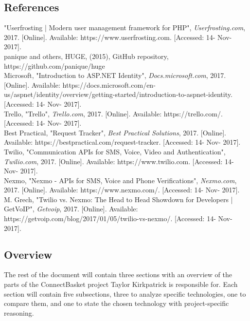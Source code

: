 \documentclass[onecolumn, draftclsnofoot,10pt, compsoc]{IEEEtran}
\begin{document}
\subsection{References}
\begin{thebibliography}{8}
"Userfrosting | Modern user management framework for PHP", \textit{Userfrosting.com}, 2017. [Online]. Available: https://www.userfrosting.com. [Accessed: 14- Nov- 2017].\\
 panique and others, HUGE, (2015), GitHub repository, https://github.com/panique/huge \\ 
 Microsoft, "Introduction to ASP.NET Identity", \textit{Docs.microsoft.com}, 2017. [Online]. Available: https://docs.microsoft.com/en-us/aspnet/identity/overview/getting-started/introduction-to-aspnet-identity. [Accessed: 14- Nov- 2017].\\
 Trello, "Trello", \textit{Trello.com}, 2017. [Online]. Available: https://trello.com/. [Accessed: 14- Nov- 2017].\\
 Best Practical, "Request Tracker", \textit{Best Practical Solutions}, 2017. [Online]. Available: https://bestpractical.com/request-tracker. [Accessed: 14- Nov- 2017].\\
 Twilio, "Communication APIs for SMS, Voice, Video and Authentication", \textit{Twilio.com}, 2017. [Online]. Available: https://www.twilio.com. [Accessed: 14- Nov- 2017].\\
 Nexmo, "Nexmo - APIs for SMS, Voice and Phone Verifications", \textit{Nexmo.com}, 2017. [Online]. Available: https://www.nexmo.com/. [Accessed: 14- Nov- 2017].\\
 M. Grech, "Twilio vs. Nexmo: The Head to Head Showdown for Developers | GetVoIP", \textit{Getvoip}, 2017. [Online]. Available: https://getvoip.com/blog/2017/01/05/twilio-vs-nexmo/. [Accessed: 14- Nov- 2017].\\
\end{thebibliography}
\subsection{Overview}
The rest of the document will contain three sections with an overview of the parts of the ConnectBasket project Taylor Kirkpatrick 
is responsible for. Each section will contain five subsections, three to analyze specific technologies, one to compare them, and one 
to state the chosen technology with project-specific reasoning.
\end{document}
